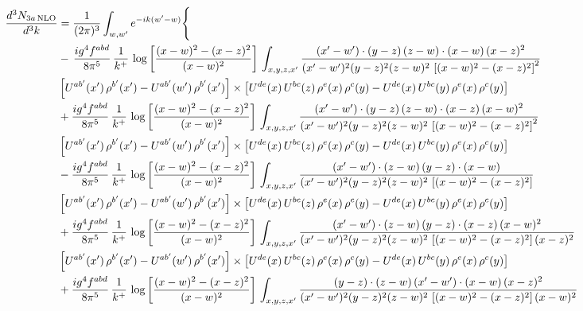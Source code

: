 \documentclass[9pt]{article}
\numberwithin{equation}{section}
\begin{document}
\begin{align}
\frac{d^{3}N_{3a\,\rm NLO}}{d^{3}k} & = \frac{1}{(2\pi)^{3}}\int_{w,w'}e^{-ik(w'-w)}\Bigg\{\notag \\
& -\,\frac{ig^{4}f^{abd}}{8\pi^{5}}\,\frac{1}{k^{+}}\,\log{\left[\frac{(x-w)^{2}-(x-z)^{2}}{(x-w)^{2}}\right]}\,\int_{x,y,z,x'}
\frac{(x'-w')\cdot(y-z)\,(z-w)\cdot(x-w)\,(x-z)^{2}}{(x'-w')^{2}(y-z)^{2}(z-w)^{2}\,\left[(x-w)^{2}-(x-z)^{2}\right]^{2}}\notag \\ & \left[U^{ab'}(x')\,\rho^{b'}(x')-U^{ab'}(w')\, \rho^{b'}(x')\right]\times \left[U^{de}(x)\,U^{bc}(z)\, \rho^{e}(x)\,\rho^{c}(y)-U^{de}(x)\,U^{bc}(y)\,\rho^{e}(x)\,\rho^{c}(y)\right] \notag \\
& +\frac{ig^{4}f^{abd}}{8\pi^{5}}\,\frac{1}{k^{+}}\,\log{\left[\frac{(x-w)^{2}-(x-z)^{2}}{(x-w)^{2}}\right]}\,\int_{x,y,z,x'}
\frac{(x'-w')\cdot(y-z)\,(z-w)\cdot(x-z)\,(x-w)^{2}}{(x'-w')^{2}(y-z)^{2}(z-w)^{2}\,\left[(x-w)^{2}-(x-z)^{2}\right]^{2}}\notag \\ 
&\left[U^{ab'}(x')\,\rho^{b'}(x')-U^{ab'}(w')\, \rho^{b'}(x')\right]\times \left[U^{de}(x)\,U^{bc}(z)\, \rho^{e}(x)\,\rho^{c}(y)-U^{de}(x)\,U^{bc}(y)\,\rho^{e}(x)\,\rho^{c}(y)\right] \notag \\
& -\frac{ig^{4}f^{abd}}{8\pi^{5}}\,\frac{1}{k^{+}}\,\log{\left[\frac{(x-w)^{2}-(x-z)^{2}}{(x-w)^{2}}\right]}\,\int_{x,y,z,x'}
\frac{(x'-w')\cdot(z-w)\,(y-z)\cdot(x-w)}{(x'-w')^{2}(y-z)^{2}(z-w)^{2}\,\left[(x-w)^{2}-(x-z)^{2}\right]}\notag \\ & \left[U^{ab'}(x')\,\rho^{b'}(x')-U^{ab'}(w')\, \rho^{b'}(x')\right]\times \left[U^{de}(x)\,U^{bc}(z)\, \rho^{e}(x)\,\rho^{c}(y)-U^{de}(x)\,U^{bc}(y)\,\rho^{e}(x)\,\rho^{c}(y)\right] \notag \\
&  +\frac{ig^{4}f^{abd}}{8\pi^{5}}\,\frac{1}{k^{+}}\,\log{\left[\frac{(x-w)^{2}-(x-z)^{2}}{(x-w)^{2}}\right]}\,\int_{x,y,z,x'}
\frac{(x'-w')\cdot(z-w)\,(y-z)\cdot(x-z)\,(x-w)^{2}}{(x'-w')^{2}(y-z)^{2}(z-w)^{2}\,\left[(x-w)^{2}-(x-z)^{2}\right](x-z)^{2}}\notag \\ & \left[U^{ab'}(x')\,\rho^{b'}(x')-U^{ab'}(w')\, \rho^{b'}(x')\right]\times \left[U^{de}(x)\,U^{bc}(z)\, \rho^{e}(x)\,\rho^{c}(y)-U^{de}(x)\,U^{bc}(y)\,\rho^{e}(x)\,\rho^{c}(y)\right] \notag \\
& +\frac{ig^{4}f^{abd}}{8\pi^{5}}\,\frac{1}{k^{+}}\,\log{\left[\frac{(x-w)^{2}-(x-z)^{2}}{(x-w)^{2}}\right]}\,\int_{x,y,z,x'}
\frac{(y-z)\cdot(z-w)\,(x'-w')\cdot(x-w)\,(x-z)^{2}}{(x'-w')^{2}(y-z)^{2}(z-w)^{2}\,\left[(x-w)^{2}-(x-z)^{2}\right](x-w)^{2}}\notag \\ 

\end{align}
\end{document}
